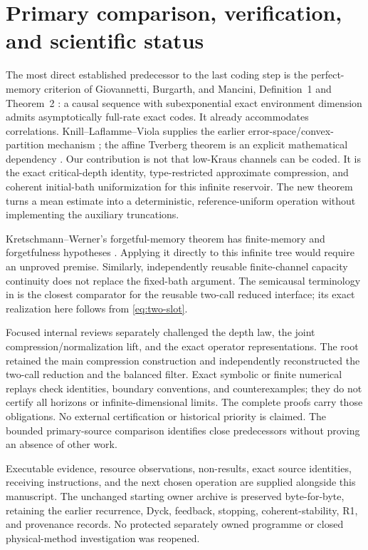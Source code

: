 \documentclass[11pt]{article}
\begin{document}
\section{Primary comparison, verification, and scientific status}

The most direct established predecessor to the last coding step is the perfect-memory criterion of Giovannetti, Burgarth, and Mancini, Definition~1 and Theorem~2 \cite{GBM}: a causal sequence with subexponential exact environment dimension admits asymptotically full-rate exact codes. It already accommodates correlations. Knill--Laflamme--Viola supplies the earlier error-space/convex-partition mechanism \cite{KLV}; the affine Tverberg theorem is an explicit mathematical dependency \cite{Tverberg}. Our contribution is not that low-Kraus channels can be coded. It is the exact critical-depth identity, type-restricted approximate compression, and coherent initial-bath uniformization for this infinite reservoir. The new theorem turns a mean estimate into a deterministic, reference-uniform operation without implementing the auxiliary truncations.

Kretschmann--Werner's forgetful-memory theorem has finite-memory and forgetfulness hypotheses \cite{KW}. Applying it directly to this infinite tree would require an unproved premise. Similarly, independently reusable finite-channel capacity continuity does not replace the fixed-bath argument. The semicausal terminology in \cite{ESW} is the closest comparator for the reusable two-call reduced interface; its exact realization here follows from \eqref{eq:two-slot}.

Focused internal reviews separately challenged the depth law, the joint compression/normalization lift, and the exact operator representations. The root retained the main compression construction and independently reconstructed the two-call reduction and the balanced filter. Exact symbolic or finite numerical replays check identities, boundary conventions, and counterexamples; they do not certify all horizons or infinite-dimensional limits. The complete proofs carry those obligations. No external certification or historical priority is claimed. The bounded primary-source comparison identifies close predecessors without proving an absence of other work.

Executable evidence, resource observations, non-results, exact source identities, receiving instructions, and the next chosen operation are supplied alongside this manuscript. The unchanged starting owner archive is preserved byte-for-byte, retaining the earlier recurrence, Dyck, feedback, stopping, coherent-stability, R1, and provenance records. No protected separately owned programme or closed physical-method investigation was reopened.
\end{document}
